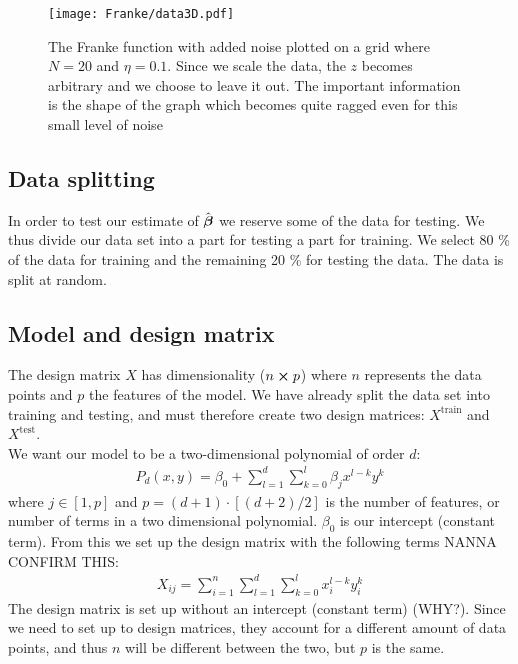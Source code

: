         \begin{figure}
            \texttt{[image: Franke/data3D.pdf]}
            \caption{The Franke function with added noise plotted on a grid where $N=20$ and $\eta=0.1$. Since we scale the data, the $z$ becomes arbitrary and we choose to leave it out. The important information is the shape of the graph which becomes quite ragged even for this small level of noise}
            \label{fig:franke_function_noise}
        \end{figure}

    \subsection{Data splitting}\label{sec:splitting}
        In order to test our estimate of $\hat{\boldsymbol{\beta}}$ we reserve some of the data for testing. We thus divide our data set into a part for testing a part for training. We select 80 \% of the data for training and the remaining 20 \% for testing the data. The data is split at random. 




    \subsection{Model and design matrix}\label{sec:model}
        The design matrix $X$ has dimensionality ($n\cross p$) where $n$ represents the data points and $p$ the features of the model. We have already split the data set into training and testing, and must therefore create two design matrices: $X^{\text{train}}$ and $X^{\text{test}}$. 
        \\
        We want our model to be a two-dimensional polynomial of order $d$:
        \begin{align*}
            P_d(x,y) = \beta_0 + \sum_{l=1}^d\sum_{k=0}^{l} \beta_jx^{l-k}y^k
        \end{align*}
        where $j\in[1,p]$ and $p=(d+1)\cdot\left[(d+2)/2\right]$ is the number of features, or number of terms in a two dimensional polynomial. $\beta_0$ is our intercept (constant term). From this we set up the design matrix with the following terms NANNA CONFIRM THIS:
        \begin{align}\label{eq:designmatrixequation}
            X_{ij} = \sum_{i=1}^n\sum_{l=1}^d\sum_{k=0}^{l} x_i^{l-k}y_i^k
        \end{align}
        The design matrix is set up without an intercept (constant term) (WHY?). Since we need to set up to design matrices, they account for a different amount of data points, and thus $n$ will be different between the two, but $p$ is the same. 






